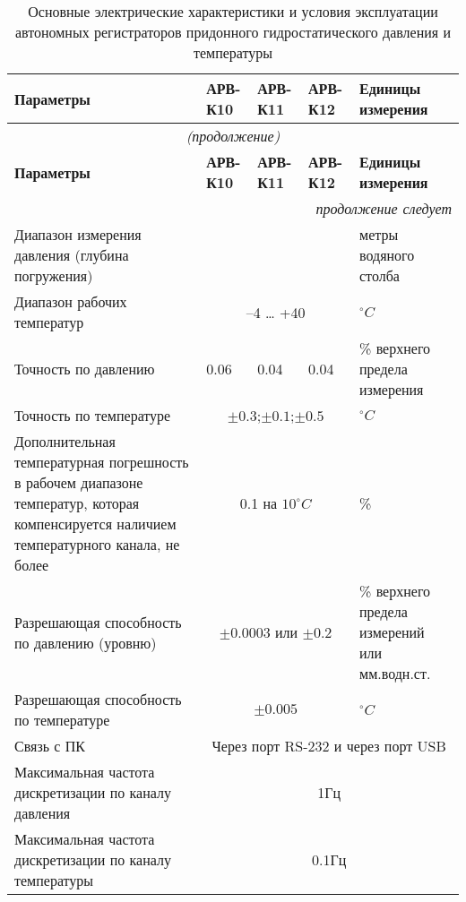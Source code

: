 \begin{longtable}{|X |X |X |X| X|}
\caption{Основные электрические характеристики и условия эксплуатации автономных регистраторов придонного гидростатического давления и температуры}\label{tbl:charact}\\
    \hline
        \textbf{Параметры} & \textbf{АРВ-К10} & \textbf{АРВ-К11} & \textbf{АРВ-К12} & \textbf{Единицы измерения} \\
    \hline
        \endfirsthead
    \hline
        \multicolumn{5}{c}{\small\slshape (продолжение)} \\
    \hline
        \textbf{Параметры} & \textbf{АРВ-К10}&\textbf{АРВ-К11}& \textbf{АРВ-К12} & \textbf{Единицы измерения} \\
    \hline
        \endhead
    \hline
        \multicolumn{5}{|r|}{\small\slshape продолжение следует}  \\
    \hline
        \endfoot
    \hline
        \endlastfoot
    \hline
        Диапазон измерения давления (глубина погружения)   & &  & & метры водяного столба\\
  \hline
        Диапазон рабочих температур  & \multicolumn{3}{|c|}{–4 … +40}& $^{\circ}C$ \\
  \hline
        Точность по давлению & 0.06 & 0.04 & 0.04 &  \% верхнего предела измерения \\
  \hline
        Точность по температуре & \multicolumn{3}{|c|}{$\pm0.3$;$\pm0.1$;$\pm0.5$} & $^{\circ}C$ \\
  \hline
        Дополнительная температурная погрешность в рабочем диапазоне температур, которая компенсируется наличием температурного канала, не более & \multicolumn{3}{|c|}{0.1 на $10^{\circ}C$ }& \% \\
  \hline
        Разрешающая способность по давлению (уровню) & \multicolumn{3}{|c|}{$\pm0.0003$ или $\pm0.2$}& \% верхнего предела измерений или мм.водн.ст. \\
  \hline
        Разрешающая способность по температуре & \multicolumn{3}{|c|}{$\pm0.005$}& $^{\circ}C$  \\
  \hline
        Связь с ПК & \multicolumn{4}{|c|}{Через порт RS-232 и через порт USB} \\
  \hline
        Максимальная частота дискретизации по каналу давления & \multicolumn{4}{|c|}{1Гц} \\
  \hline
        Максимальная частота дискретизации по каналу температуры & \multicolumn{4}{|c|}{0.1Гц} \\

\end{longtable}
